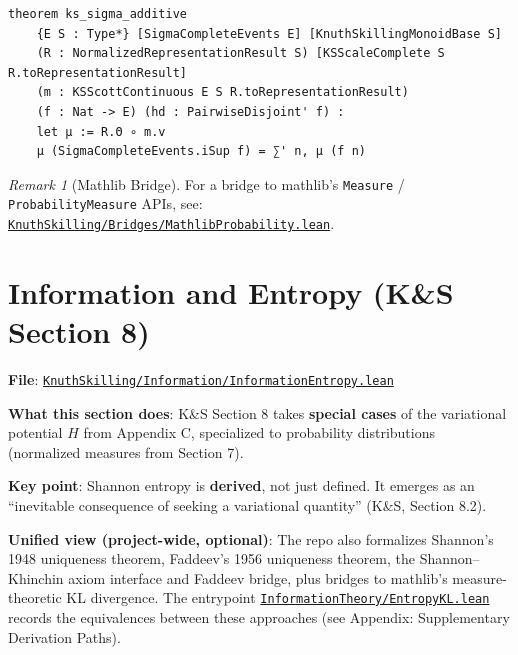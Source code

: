 \documentclass[11pt]{article}
\theoremstyle{definition}
\theoremstyle{remark}
\newtheorem{remark}[theorem]{Remark}
\begin{document}
\begin{lstlisting}[caption={$\sigma$-additivity theorem (signature)}]
theorem ks_sigma_additive
    {E S : Type*} [SigmaCompleteEvents E] [KnuthSkillingMonoidBase S]
    (R : NormalizedRepresentationResult S) [KSScaleComplete S R.toRepresentationResult]
    (m : KSScottContinuous E S R.toRepresentationResult)
    (f : Nat -> E) (hd : PairwiseDisjoint' f) :
    let μ := R.Θ ∘ m.v
    μ (SigmaCompleteEvents.iSup f) = ∑' n, μ (f n)
\end{lstlisting}

\begin{remark}[Mathlib Bridge]
For a bridge to mathlib's \texttt{Measure} / \texttt{ProbabilityMeasure} APIs, see:
\href{https://github.com/zariuq/ks-foundations-of-inference/blob/main/KnuthSkilling/Bridges/MathlibProbability.lean}{\texttt{KnuthSkilling/Bridges/MathlibProbability.lean}}.
\end{remark}

\section{Information and Entropy (K\&S Section 8)}

\textbf{File}: \href{https://github.com/zariuq/ks-foundations-of-inference/blob/main/KnuthSkilling/Information/InformationEntropy.lean}{\texttt{KnuthSkilling/Information/InformationEntropy.lean}}

\textbf{What this section does}: K\&S Section 8 takes \textbf{special cases} of the variational potential $H$ from Appendix C, specialized to probability distributions (normalized measures from Section 7).

\textbf{Key point}: Shannon entropy is \textbf{derived}, not just defined. It emerges as an ``inevitable consequence of seeking a variational quantity'' (K\&S, Section 8.2).

\textbf{Unified view (project-wide, optional)}: The repo also formalizes Shannon's 1948 uniqueness theorem, Faddeev's 1956 uniqueness theorem, the Shannon--Khinchin axiom interface and Faddeev bridge, plus bridges to mathlib's measure-theoretic KL divergence. The entrypoint \href{https://github.com/zariuq/ks-foundations-of-inference/blob/main/InformationTheory/EntropyKL.lean}{\texttt{InformationTheory/EntropyKL.lean}} records the equivalences between these approaches (see Appendix: Supplementary Derivation Paths).
\end{document}
